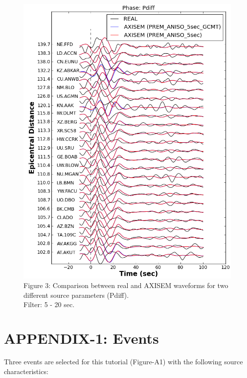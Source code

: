 \documentclass{article}
\begin{document}
\begin{figure}[H]
\begin{minipage}{.5\textwidth}
        \includegraphics[width=0.9\linewidth]{AXISEMTutorial-fig014.png}
        {\small{}Figure 3: Comparison between real and AXISEM waveforms for two different 
        source parameters (Pdiff). \\ Filter: 5 - 20 sec.}
    \end{minipage}
\end{figure}


\newpage
\appendix
\section{APPENDIX-1: Events}

Three events are selected for this tutorial (Figure-A1) with the following source 
characteristics:
\end{document}
